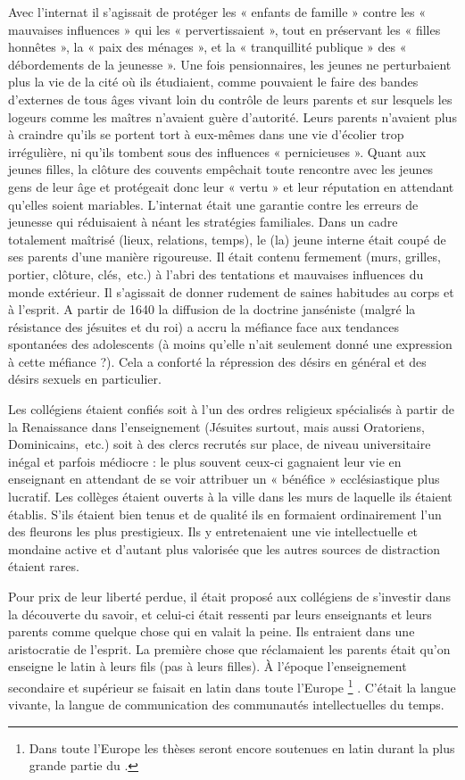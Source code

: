  Avec l'internat il s'agissait de protéger les « enfants de famille » contre les « mauvaises influences » qui les « pervertissaient », tout en préservant les « filles honnêtes », la « paix des ménages », et la « tranquillité publique » des « débordements de la jeunesse ». Une fois pensionnaires, les jeunes ne perturbaient plus la vie de la cité où ils étudiaient, comme pouvaient le faire des bandes d'externes de tous âges vivant loin du contrôle de leurs parents et sur lesquels les logeurs comme les maîtres n'avaient guère d'autorité. Leurs parents n'avaient plus à craindre qu'ils se portent tort à eux-mêmes dans une vie d'écolier trop irrégulière, ni qu'ils tombent sous des influences « pernicieuses ». Quant aux jeunes filles, la clôture des couvents empêchait toute rencontre avec les jeunes gens de leur âge et protégeait donc leur « vertu » et leur réputation en attendant qu'elles soient mariables. L'internat était une garantie contre les erreurs de jeunesse qui réduisaient à néant les stratégies familiales. Dans un cadre totalement maîtrisé (lieux, relations, temps), le (la) jeune interne était coupé de ses parents d'une manière rigoureuse. Il était contenu fermement (murs, grilles, portier, clôture, clés,~etc.) à l'abri des tentations et mauvaises influences du monde extérieur. Il s'agissait de donner rudement de saines habitudes au corps et à l'esprit. A partir de 1640 la diffusion de la doctrine janséniste (malgré la résistance des jésuites et du roi) a accru la méfiance face aux tendances spontanées des adolescents (à moins qu'elle n'ait seulement donné une expression à cette méfiance ?). Cela a conforté la répression des désirs en général et des désirs sexuels en particulier.
 

Les collégiens étaient confiés soit à l'un des ordres religieux spécialisés à partir de la Renaissance dans l'enseignement (Jésuites surtout, mais aussi Oratoriens, Dominicains,~etc.) soit à des clercs recrutés sur place, de niveau universitaire inégal et parfois médiocre : le plus souvent ceux-ci gagnaient leur vie en enseignant en attendant de se voir attribuer un « bénéfice » ecclésiastique plus lucratif. Les collèges étaient ouverts à la ville dans les murs de laquelle ils étaient établis. S'ils étaient bien tenus et de qualité ils en formaient ordinairement l'un des fleurons les plus prestigieux. Ils y entretenaient une vie intellectuelle et mondaine active et d'autant plus valorisée que les autres sources de distraction étaient rares. 

 Pour prix de leur liberté perdue, il était proposé aux collégiens de s'investir dans la découverte du savoir, et celui-ci était ressenti par leurs enseignants et leurs parents comme quelque chose qui en valait la peine. Ils entraient dans une aristocratie de l'esprit. La première chose que réclamaient les parents était qu'on enseigne le latin à leurs fils (pas à leurs filles). À l'époque l'enseignement secondaire et supérieur se faisait en latin dans toute l'Europe%
\footnote{Dans toute l'Europe les thèses seront encore soutenues en latin durant la plus grande partie du .}%
. C'était la langue vivante, la langue de communication des communautés intellectuelles du temps. 

